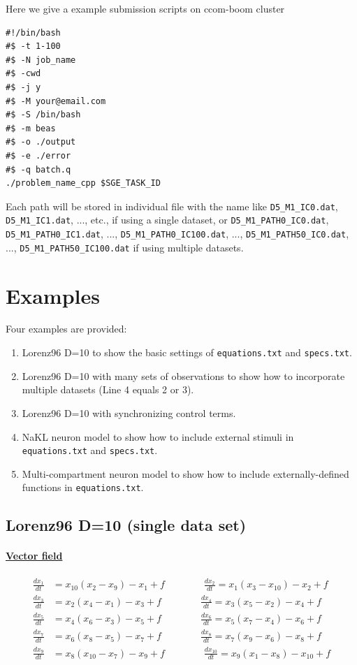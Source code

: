 \documentclass[11pt]{article}
\begin{document}
{Here we give a example submission scripts on ccom-boom cluster
\begin{verbatim}
#!/bin/bash
#$ -t 1-100
#$ -N job_name
#$ -cwd
#$ -j y
#$ -M your@email.com
#$ -S /bin/bash
#$ -m beas
#$ -o ./output
#$ -e ./error
#$ -q batch.q
./problem_name_cpp $SGE_TASK_ID
\end{verbatim}

Each path will be stored in individual file with the name like \texttt{D5\_M1\_IC0.dat}, \texttt{D5\_M1\_IC1.dat}, ..., etc., if using a single dataset, or \texttt{D5\_M1\_PATH0\_IC0.dat}, \texttt{D5\_M1\_PATH0\_IC1.dat}, ..., \texttt{D5\_M1\_PATH0\_IC100.dat}, ..., \texttt{D5\_M1\_PATH50\_IC0.dat}, ..., \texttt{D5\_M1\_PATH50\_IC100.dat} if using multiple datasets. 

\section{Examples}

Four examples are provided:

\begin{enumerate}
\item Lorenz96 D=10 to show the basic settings of \texttt{equations.txt} and \texttt{specs.txt}. 
\item Lorenz96 D=10 with many sets of observations to show how to incorporate multiple datasets (Line 4 equals 2 or 3).
\item Lorenz96 D=10 with synchronizing control terms.
\item NaKL neuron model to show how to include external stimuli in \texttt{equations.txt} and \texttt{specs.txt}.
\item Multi-compartment neuron model to show how to include externally-defined functions in \texttt{equations.txt}.
\end{enumerate}


\subsection{Lorenz96 D=10 (single data set)}
\paragraph{\underline{Vector field}}
\begin{align*}
\frac{dx_1}{dt}&= x_{10}(x_2-x_9)-x_1+f \qquad \qquad \frac{dx_2}{dt}= x_1(x_3-x_{10})-x_2+f\\
\frac{dx_3}{dt}&= x_2(x_4-x_1)-x_3+f \qquad \qquad \frac{dx_4}{dt}= x_3(x_5-x_2)-x_4+f\\
\frac{dx_5}{dt}&= x_4(x_6-x_3)-x_5+f \qquad \qquad  \frac{dx_6}{dt}= x_5(x_7-x_4)-x_6+f\\
\frac{dx_7}{dt}&= x_6(x_8-x_5)-x_7+f \qquad \qquad \frac{dx_8}{dt}= x_7(x_9-x_6)-x_8+f\\
\frac{dx_9}{dt}&= x_8(x_{10}-x_7)-x_9+f  \qquad \qquad  \frac{dx_{10}}{dt} = x_9(x_1-x_8)-x_{10}+f
\end{align*}
}
\end{document}
